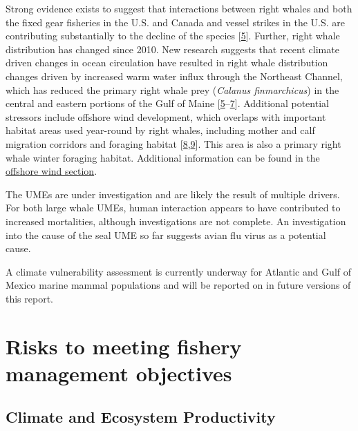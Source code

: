 \documentclass[
  10pt,
]{article}
\begin{document}
Strong evidence exists to suggest that interactions between right whales and both the fixed gear fisheries in the U.S. and Canada and vessel strikes in the U.S. are contributing substantially to the decline of the species {[}\protect\hyperlink{ref-hayes_north_2018}{5}{]}. Further, right whale distribution has changed since 2010. New research suggests that recent climate driven changes in ocean circulation have resulted in right whale distribution changes driven by increased warm water influx through the Northeast Channel, which has reduced the primary right whale prey (\emph{Calanus finmarchicus}) in the central and eastern portions of the Gulf of Maine {[}\protect\hyperlink{ref-hayes_north_2018}{5}--\protect\hyperlink{ref-sorochan_north_2019}{7}{]}. Additional potential stressors include offshore wind development, which overlaps with important habitat areas used year-round by right whales, including mother and calf migration corridors and foraging habitat {[}\protect\hyperlink{ref-quintana-rizzo_narw_wind_2021}{8},\protect\hyperlink{ref-schick_whale_2009}{9}{]}. This area is also a primary right whale winter foraging habitat. Additional information can be found in the \protect\hyperlink{other-ocean-uses:-offshore-wind}{offshore wind section}.

The UMEs are under investigation and are likely the result of multiple drivers. For both large whale UMEs, human interaction appears to have contributed to increased mortalities, although investigations are not complete. An investigation into the cause of the seal UME so far suggests avian flu virus as a potential cause.

A climate vulnerability assessment is currently underway for Atlantic and Gulf of Mexico marine mammal populations and will be reported on in future versions of this report.

\newpage

\hypertarget{risks-to-meeting-fishery-management-objectives}{%
\section{Risks to meeting fishery management objectives}\label{risks-to-meeting-fishery-management-objectives}}

\hypertarget{climate-and-ecosystem-productivity}{%
\subsection{Climate and Ecosystem Productivity}\label{climate-and-ecosystem-productivity}}
\end{document}
